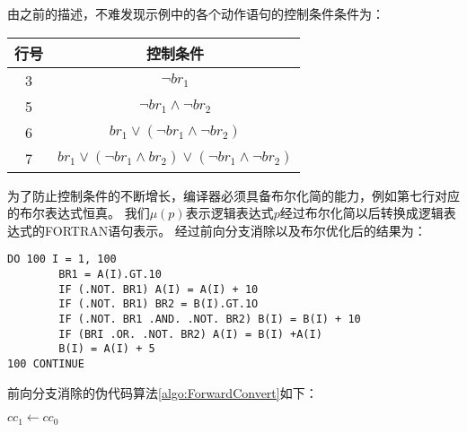 由之前的描述，不难发现示例中的各个动作语句的控制条件条件为：

\begin{tabular}{|c|c|}
\hline
行号	&	控制条件																					\\
\hline
3	&	$\neg br_1$																				\\
5	&	$\neg br_1 \wedge\neg br_2$																\\
6	&	$br_1\vee\left(\neg br_1 \wedge\neg br_2\right)$										\\
7	&	$br_1\vee\left(\neg br_1 \wedge br_2\right)\vee\left(\neg br_1 \wedge\neg br_2\right)$	\\
\hline
\end{tabular}

为了防止控制条件的不断增长，编译器必须具备布尔化简的能力，例如第七行对应的布尔表达式恒真。
我们$\mu\left(p\right)$表示逻辑表达式$p$经过布尔化简以后转换成逻辑表达式的FORTRAN语句表示。
经过前向分支消除以及布尔优化后的结果为：

\begin{lstlisting}[language=FORTRAN]
	DO 100 I = 1, 100
		BR1 = A(I).GT.10
		IF (.NOT. BR1) A(I) = A(I) + 10
		IF (.NOT. BR1) BR2 = B(I).GT.1O
		IF (.NOT. BR1 .AND. .NOT. BR2) B(I) = B(I) + 10
		IF (BRI .OR. .NOT. BR2) A(I) = B(I) +A(I)
		B(I) = A(I) + 5
100	CONTINUE
\end{lstlisting}
前向分支消除的伪代码算法\ref{algo:ForwardConvert}如下：

\begin{algorithm}[H]
	\label{algo:ForwardConvert}
	\caption{$forward\_convert\left(x,cc_0\right)$}
	$cc_1\leftarrow cc_0$\;
\end{algorithm}

